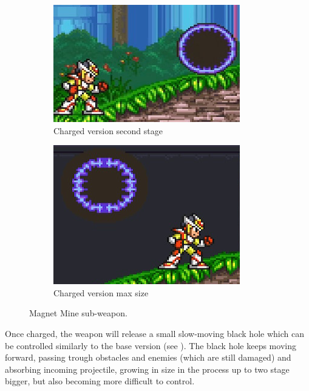 	\begin{figure}[htp]
		\ContinuedFloat
		\centering
	\begin{subfigure}[t]{0.4\linewidth}
		\centering
		\includegraphics[width=\linewidth]{figures/X2/weapons/M_mine_5.png}	
		\caption{Charged version second stage}
	\end{subfigure}
	\begin{subfigure}[t]{0.35\linewidth}
		\centering
		\includegraphics[width=\linewidth]{figures/X2/weapons/M_mine_6.png}	
		\caption{Charged version max size}
	\end{subfigure}
	\caption{Magnet Mine sub-weapon.}
\end{figure}
Once charged, the weapon will release a small slow-moving black hole which can be controlled similarly to the base version (see ). The black hole keeps moving forward, passing trough obstacles and enemies (which are still damaged) and absorbing incoming projectile, growing in size in the process up to two stage bigger, but also becoming more difficult to control.



